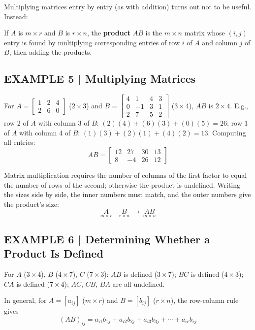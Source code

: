 \documentclass{article}
\theoremstyle{mystyle}
\begin{document}
Multiplying matrices entry by entry (as with addition) turns out not to be useful. Instead:

\begin{tcolorbox}[colback=teal!4, colframe=teal!65!black, title=Definition 5, fonttitle=\bfseries, boxrule=0.5mm, arc=3mm]
If $A$ is $m\times r$ and $B$ is $r\times n$, the \textbf{product} $AB$ is the $m\times n$ matrix whose $(i,j)$ entry is found by multiplying corresponding entries of row $i$ of $A$ and column $j$ of $B$, then adding the products.
\end{tcolorbox}

\subsection*{EXAMPLE 5 | Multiplying Matrices}
For $A=\begin{bmatrix}1&2&4\\2&6&0\end{bmatrix}$ ($2\times3$) and $B=\begin{bmatrix}4&1&4&3\\0&-1&3&1\\2&7&5&2\end{bmatrix}$ ($3\times4$), $AB$ is $2\times4$. E.g., row 2 of $A$ with column 3 of $B$: $(2)(4)+(6)(3)+(0)(5)=26$; row 1 of $A$ with column 4 of $B$: $(1)(3)+(2)(1)+(4)(2)=13$. Computing all entries:
\[
AB=\begin{bmatrix}12&27&30&13\\8&-4&26&12\end{bmatrix}
\]

Matrix multiplication requires the number of columns of the first factor to equal the number of rows of the second; otherwise the product is undefined. Writing the sizes side by side, the inner numbers must match, and the outer numbers give the product's size:
\[
\underset{m\times r}{A}\quad\underset{r\times n}{B}\ \to\ \underset{m\times n}{AB} \tag{3}
\]

\subsection*{EXAMPLE 6 | Determining Whether a Product Is Defined}
For $A$ ($3\times4$), $B$ ($4\times7$), $C$ ($7\times3$): $AB$ is defined ($3\times7$); $BC$ is defined ($4\times3$); $CA$ is defined ($7\times4$); $AC$, $CB$, $BA$ are all undefined.

In general, for $A=[a_{ij}]$ ($m\times r$) and $B=[b_{ij}]$ ($r\times n$), the row-column rule gives
\[
(AB)_{ij}=a_{i1}b_{1j}+a_{i2}b_{2j}+a_{i3}b_{3j}+\cdots+a_{ir}b_{rj} \tag{5}
\]
\end{document}
